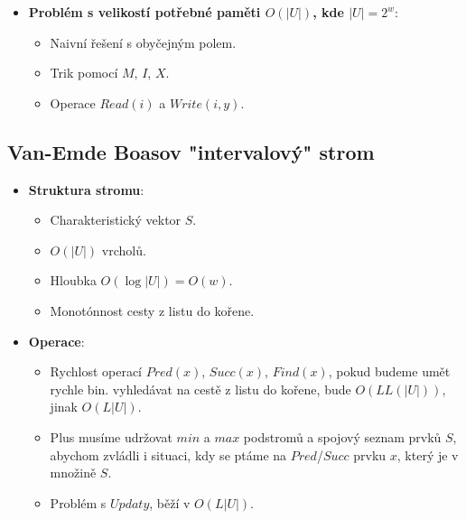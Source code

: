 \documentclass[11pt,a4paper]{article}
\begin{document}
\begin{itemize}
\begin{itemize}
        \item Zavoláme $P_i.Delete(j)$.
        \item Pokud se $P_i$ vyprázdnila, musíme aktualizovat $Sum$.
        \item Aktualizovat $max$, kdybychom ho smazali.
    \end{itemize}
    \item \textbf{Problém s velikostí potřebné paměti $O(|U|)$, kde $|U| = 2^w$}:
    \begin{itemize}
        \item Naivní řešení s obyčejným polem.
        \item Trik pomocí $M$, $I$, $X$.
        \item Operace $Read(i)$ a $Write(i, y)$.
    \end{itemize}


\end{itemize}

\subsection{Van-Emde Boasov "intervalový" strom}
    \begin{itemize}
        \item \textbf{Struktura stromu}:
        \begin{itemize}
            \item Charakteristický vektor $S$.
            \item $O(|U|)$ vrcholů.
            \item Hloubka $O(\log|U|) = O(w)$.
            \item Monotónnost cesty z listu do kořene.
        \end{itemize}
        \item \textbf{Operace}:
        \begin{itemize}
            \item Rychlost operací $Pred(x)$, $Succ(x)$, $Find(x)$, pokud budeme umět rychle bin. vyhledávat na cestě z listu do kořene, bude $O(LL(|U|))$, jinak $O(L|U|)$.
            \item Plus musíme udržovat $min$ a $max$ podstromů a spojový seznam prvků $S$, abychom zvládli i situaci, kdy se ptáme na $Pred$/$Succ$ prvku $x$, který je v množině $S$.
            \item Problém s $Updaty$, běží v $O(L|U|)$.
        \end{itemize}
    \end{itemize}
\end{document}
